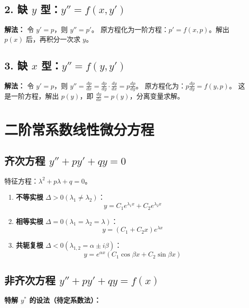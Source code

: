 \documentclass[a4paper,12pt]{ctexart}
\begin{document}
\subsection{2. 缺 $y$ 型：$y'' = f(x, y')$}
\textbf{解法：} 令 $y' = p$，则 $y'' = p'$。
原方程化为一阶方程：$p' = f(x, p)$。解出 $p(x)$ 后，再积分一次求 $y$。

\subsection{3. 缺 $x$ 型：$y'' = f(y, y')$}
\textbf{解法：} 令 $y' = p$，则 $y'' = \frac{dp}{dx} = \frac{dp}{dy} \cdot \frac{dy}{dx} = p \frac{dp}{dy}$。
原方程化为：$p \frac{dp}{dy} = f(y, p)$。
这是一阶方程，解出 $p(y)$，即 $\frac{dy}{dx} = p(y)$，分离变量求解。

\section{二阶常系数线性微分方程}

\subsection{齐次方程 $y'' + py' + qy = 0$}
特征方程：$\lambda^2 + p\lambda + q = 0$。

\begin{enumerate}
    \item \textbf{不等实根} $\Delta > 0 (\lambda_1 \neq \lambda_2)$：
    \[ y = C_1 e^{\lambda_1 x} + C_2 e^{\lambda_2 x} \]
    \item \textbf{相等实根} $\Delta = 0 (\lambda_1 = \lambda_2 = \lambda)$：
    \[ y = (C_1 + C_2 x) e^{\lambda x} \]
    \item \textbf{共轭复根} $\Delta < 0 (\lambda_{1,2} = \alpha \pm i\beta)$：
    \[ y = e^{\alpha x} (C_1 \cos \beta x + C_2 \sin \beta x) \]
\end{enumerate}

\subsection{非齐次方程 $y'' + py' + qy = f(x)$}
\textbf{特解 $y^*$ 的设法（待定系数法）：}
\end{document}
